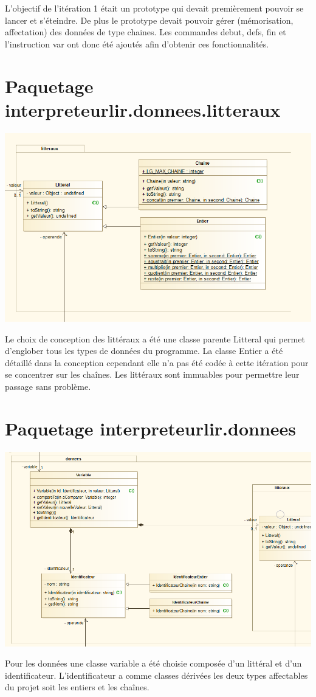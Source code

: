 \par L'objectif de l'itération 1 était un prototype qui devait premièrement pouvoir se lancer et s'éteindre. De plus le prototype devait pouvoir gérer (mémorisation, affectation) des données de type chaines. Les commandes debut, defs, fin et l'instruction var ont donc été ajoutés afin d'obtenir ces fonctionnalités.

\section{Paquetage interpreteurlir.donnees.litteraux}
\includegraphics[scale=0.75]{./img/COO/COO_prototype_1/PackageLitteraux}
\par Le choix de conception des littéraux a été une classe parente Litteral qui permet d'englober tous les types de données du programme.
La classe Entier a été détaillé dans la conception cependant elle n'a pas été codée à cette itération pour se concentrer sur les chaînes.
Les littéraux sont immuables pour permettre leur passage sans problème.

\section{Paquetage interpreteurlir.donnees}
\includegraphics[scale=0.65]{./img/COO/COO_prototype_1/PackageDonnees}
\par Pour les données une classe variable a été choisie composée d'un littéral et d'un identificateur.
L'identificateur a comme classes dérivées les deux types affectables du projet soit les entiers et les chaînes.

